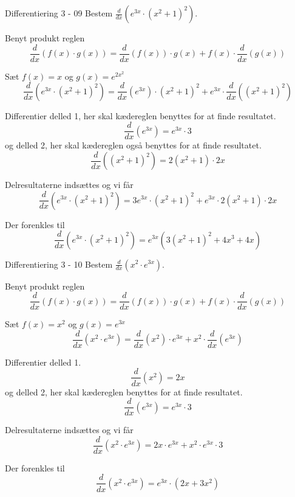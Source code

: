 \documentclass{article}
\begin{document}
\begin{exercise}{Differentiering 3 - 09}
	Bestem $\frac{d}{dx} \left(e^{3x} \cdot (x^2 + 1)^2 \right)$.
	
	
	\hint
	Benyt produkt reglen
	\[
	\frac{d}{dx} \left( f(x) \cdot g(x) \right) = \frac{d}{dx} \left( f(x) \right) \cdot g(x) + f(x) \cdot \frac{d}{dx} \left( g(x) \right)
	\]
	
	\hint
	Sæt $f(x) = x$ og $g(x) = e^{2x^2}$
	\[
	\frac{d}{dx} \left( e^{3x} \cdot (x^2+1)^2 \right) = \frac{d}{dx} \left( e^{3x} \right) \cdot (x^2+1)^2 + e^{3x} \cdot \frac{d}{dx} \left( (x^2 + 1)^2 \right)
	\]
	
	\hint
	Differentier delled 1, her skal kædereglen benyttes for at finde resultatet.
	\[
	\frac{d}{dx} \left( e^{3x} \right) = e^{3x} \cdot 3 
	\]
	og delled 2, her skal kædereglen også benyttes for at finde resultatet.
	\[
	\frac{d}{dx} \left( (x^2+1)^2 \right) = 2 (x^2+1) \cdot 2x
	\]
	
	
	\hint
	Delresultaterne indsættes og vi får
	\[
	\frac{d}{dx} \left( e^{3x} \cdot (x^2 + 1)^2 \right) = 3e^{3x} \cdot (x^2+1)^2 + e^{3x} \cdot 2 (x^2 + 1)  \cdot 2x
	\]
	
	\hint
	Der forenkles til 
	\[
	\frac{d}{dx} \left( e^{3x} \cdot (x^2 + 1)^2 \right) = e^{3x} \left( 3 (x^2 +1)^2 + 4x^3 + 4x  \right)
	\]
	
\end{exercise}


\begin{exercise}{Differentiering 3 - 10}
	Bestem $\frac{d}{dx} \left( x^2 \cdot e^{3x} \right)$.
	
	
	\hint
	Benyt produkt reglen
	\[
	\frac{d}{dx} \left( f(x) \cdot g(x) \right) = \frac{d}{dx} \left( f(x) \right) \cdot g(x) + f(x) \cdot \frac{d}{dx} \left( g(x) \right)
	\]
	
	\hint
	Sæt $f(x) = x^2$ og $g(x) = e^{3x}$
	\[
	\frac{d}{dx} \left( x^2\cdot e^{3x} \right) = \frac{d}{dx} \left( x^2 \right) \cdot e^{3x} + x^2 \cdot \frac{d}{dx} \left( e^{3x} \right)
	\]
	
	\hint
	Differentier delled 1.
	\[
	\frac{d}{dx} \left( x^2 \right) = 2x
	\]
	og delled 2, her skal kædereglen benyttes for at finde resultatet.
	\[
	\frac{d}{dx} \left( e^{3x} \right) = e^{3x} \cdot 3
	\]
	
	
	\hint
	Delresultaterne indsættes og vi får
	\[
	\frac{d}{dx} \left( x^2 \cdot e^{3x} \right) = 2x \cdot e^{3x} + x^2 \cdot e^{3x} \cdot 3
	\]
	
	\hint
	Der forenkles til 
	\[
	\frac{d}{dx} \left( x^2 \cdot e^{3x} \right) = e^{3x} \cdot (2x + 3x^2) 
	\]
	
\end{exercise}
\end{document}
